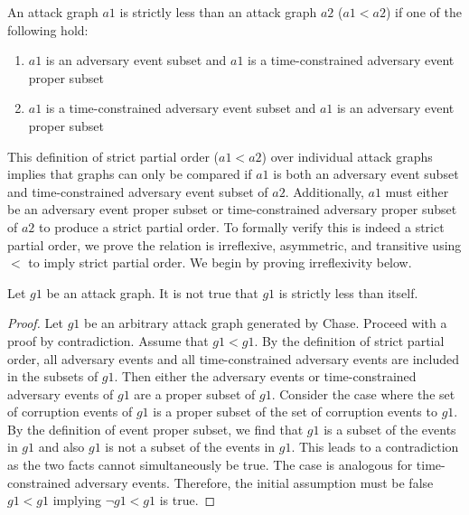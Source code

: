 \documentclass[runningheads]{llncs}
\theoremstyle{definition}
\newcommand{\squash}{\itemsep=0pt\parskip=0pt}
\begin{document}
\begin{definition}
    An attack graph $a1$ is strictly less than an attack graph $a2$ ($a1 < a2$) if one of the following hold: 
\begin{enumerate}
    \squash
    \item $a1$ is an adversary event subset and $a1$ is a time-constrained adversary event proper subset
    \item $a1$ is a time-constrained adversary event subset and $a1$ is an adversary event proper subset
\end{enumerate}
\end{definition}

This definition of strict partial order ($a1 < a2$) over individual attack graphs implies that graphs can only be compared if $a1$ is both an adversary event subset and time-constrained adversary event subset of $a2$. Additionally, $a1$ must either be an adversary event proper subset or time-constrained adversary proper subset of $a2$ to produce a strict partial order. To formally verify this is indeed a strict partial order, we prove the relation is irreflexive, asymmetric, and transitive using $<$ to imply strict partial order. We begin by proving irreflexivity below.



\begin{theorem}
    Let $g1$ be an attack graph. It is not true that $g1$ is strictly less than itself.
\end{theorem}
\begin{proof}
    Let $g1$ be an arbitrary attack graph generated by Chase. Proceed with a proof by contradiction. Assume that $g1 < g1$. By the definition of strict partial order, all adversary events and all time-constrained adversary events are included in the subsets of $g1$. Then either the adversary events or time-constrained adversary events of $g1$ are a proper subset of $g1$. Consider the case where the set of corruption events of $g1$ is a proper subset of the set of corruption events to $g1$. By the definition of event proper subset, we find that $g1$ is a subset of the events in $g1$ and also $g1$ is not a subset of the events in $g1$. This leads to a contradiction as the two facts cannot simultaneously be true. The case is analogous for time-constrained adversary events.  Therefore, the initial assumption must be false $g1 < g1$ implying $\neg g1 < g1$ is true. 
\end{proof}
\end{document}
